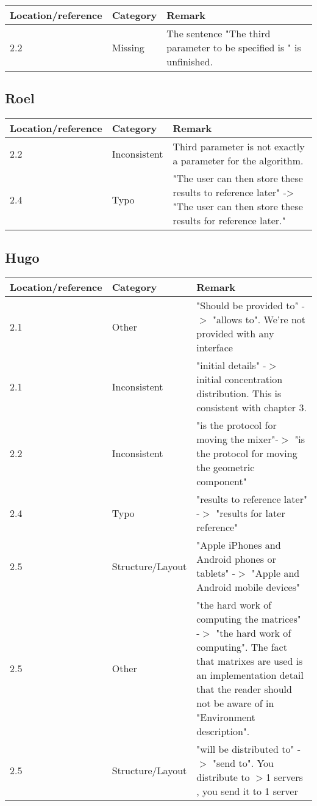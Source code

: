 \begin{tabular}{l|l|p{}}
Location/reference & Category & Remark\\
\hline
\hline
2.2 & Missing & The sentence "The third parameter to be specified is " is unfinished.\\
\end{tabular}

\subsection*{Roel}

\begin{tabular}{l|l|p{}}
Location/reference & Category & Remark\\
\hline
\hline
2.2 & Inconsistent & Third parameter is not exactly a parameter for the algorithm.\\
2.4 & Typo & "The user can then store these results to reference later" -> "The user can then store these results for reference later."\\
\end{tabular}

\subsection*{Hugo}

\begin{tabular}{l|l|p{}}
Location/reference & Category & Remark\\
\hline
\hline
2.1 & Other & "Should be provided to" -$>$ "allows to". We're not provided with any interface\\
2.1 & Inconsistent & "initial details" -$>$ initial concentration distribution. This is consistent with chapter 3.\\
2.2 & Inconsistent & "is the protocol for moving the mixer"-$>$ "is the protocol for moving the geometric component"\\
2.4 & Typo & "results to reference later" -$>$ "results for later reference"\\
2.5 & Structure/Layout & "Apple iPhones and Android phones or tablets" -$>$ "Apple and Android mobile devices"\\
2.5 & Other & "the hard work of computing the matrices" -$>$ "the hard work of computing". The fact that matrixes are used is an implementation detail that the reader should not be aware of in "Environment description".\\
2.5 & Structure/Layout & "will be distributed to" -$>$ "send to". You distribute to $>$1 servers , you send it to 1 server\\

\end{tabular}

